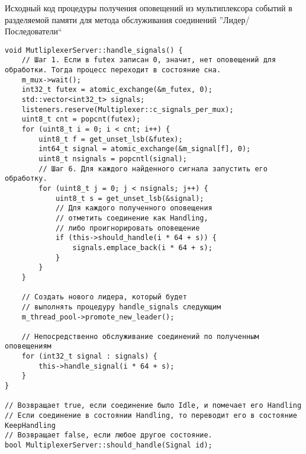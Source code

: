 \begin{algorithm}[!h]
\caption{Исходный код процедуры получения оповещений из мультиплексора событий в разделяемой памяти для метода обслуживания соединений ''Лидер/Последователи``}
\label{appendix91:LFReceiverCode}
\begin{lstlisting}[frame=tlrb]
void MutliplexerServer::handle_signals() {
	// Шаг 1. Если в futex записан 0, значит, нет оповещений для обработки. Тогда процесс переходит в состояние сна.
	m_mux->wait();
	int32_t futex = atomic_exchange(&m_futex, 0);
	std::vector<int32_t> signals;
	listeners.reserve(Multiplexer::c_signals_per_mux);
	uint8_t cnt = popcnt(futex);
	for (uint8_t i = 0; i < cnt; i++) {
		uint8_t f = get_unset_lsb(&futex);
		int64_t signal = atomic_exchange(&m_signal[f], 0);
		uint8_t nsignals = popcntl(signal);
		// Шаг 6. Для каждого найденного сигнала запустить его обработку.
		for (uint8_t j = 0; j < nsignals; j++) {
			uint8_t s = get_unset_lsb(&signal);
			// Для каждого полученного оповещения
			// отметить соединение как Handling,
			// либо проигнорировать оповещение
			if (this->should_handle(i * 64 + s)) {
				signals.emplace_back(i * 64 + s);
			}
		}
	}
	
	// Создать нового лидера, который будет
	// выполнять процедуру handle_signals следующим
	m_thread_pool->promote_new_leader();
	
	// Непосредственно обслуживание соединений по полученным оповещениям
	for (int32_t signal : signals) {
		this->handle_signal(i * 64 + s);
	}
}

// Возвращает true, если соединение было Idle, и помечает его Handling
// Если соединение в состоянии Handling, то переводит его в состояние KeepHandling
// Возвращает false, если любое другое состояние.
bool MultiplexerServer::should_handle(Signal id);
\end{lstlisting}
\end{algorithm}

